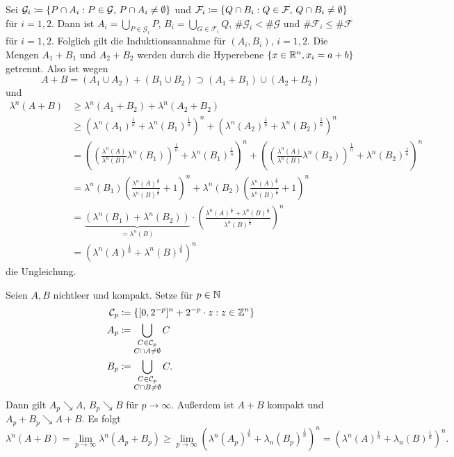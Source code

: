 \documentclass[a4paper,twoside,DIV15,BCOR12mm]{scrbook}
\begin{document}
\begin{beweis}
Sei $\mathcal G_i \da \{P \cap A_i: P\in\mathcal G,\, P\cap A_i\ne \emptyset\}$ und $\mathcal F_i \da \{Q \cap B_i: Q\in\mathcal F,\, Q\cap B_i\ne \emptyset\}$ für $i=1,2$. Dann ist $A_i = \bigcup_{P\in \mathcal G_i}P$, $B_i = \bigcup_{G\in \mathcal F_i}Q$, $\#\mathcal G_i < \#\mathcal G$ und $\#\mathcal F_i \le \#\mathcal F$ für $i=1,2$. Folglich gilt die Induktionsannahme für $(A_i,B_i)$, $i=1,2$. Die Mengen $A_1 + B_1$ und $A_2+B_2$ werden durch die Hyperebene $\{x\in\mathbb{R}^n, x_i = a+b\}$ getrennt. Also ist wegen
\[
A+B = (A_1\cup A_2) + (B_1\cup B_2) \supset (A_1 + B_1) \cup (A_2 + B_2)
\]
und
\begin{align*}
\lambda^n(A+B)
&\ge \lambda^n(A_1+B_2) + \lambda^n(A_2+B_2) \\
&\ge \left(\lambda^n(A_1)^{\frac 1n} + \lambda^n(B_1)^{\frac 1n}\right)^n + \left(\lambda^n(A_2)^{\frac 1n} + \lambda^n(B_2)^{\frac 1n}\right)^n \\
&= \left(\left(\frac{\lambda^n(A)}{\lambda^n(B)}\lambda^n(B_1)\right)^{\frac 1n} + \lambda^n(B_1)^{\frac 1n}\right)^n + \left(\left(\frac{\lambda^n(A)}{\lambda^n(B)}\lambda^n(B_2)\right)^{\frac 1n} + \lambda^n(B_2)^{\frac 1n}\right)^n\\
&= \lambda^n(B_1)\left( \frac{\lambda^n(A)^{\frac 1n}}{\lambda^n(B)^{\frac 1n}} + 1 \right)^n +\lambda^n(B_2)\left( \frac{\lambda^n(A)^{\frac 1n}}{\lambda^n(B)^{\frac 1n}} + 1 \right)^n\\
&= \underbrace{(\lambda^n(B_1) + \lambda^n(B_2))}_{=\lambda^n(B)} \cdot \left( \frac{\lambda^n(A)^{\frac 1n} + \lambda^n(B)^{\frac 1n}}{\lambda^n(B)^{\frac 1n}}\right)^n \\
&= \left( \lambda^n(A)^{\frac1n} + \lambda^n(B)^{\frac1n} \right)^n
\end{align*}
die Ungleichung.

Seien $A,B$ nichtleer und kompakt. Setze für $p\in\mathbb{N}$
\begin{align*}
\mathcal C_p &\da \{[0,2^{-p}]^n + 2^{-p}\cdot z : z\in\MdZ^n\} \\
A_p &\da \bigcup_{\substack{C\in\mathcal C_p \\ C\cap A \ne \emptyset}} C \\
B_p &\da \bigcup_{\substack{C\in\mathcal C_p \\ C\cap B \ne \emptyset}} C.
\end{align*}
Dann gilt $A_p \searrow A$, $B_p \searrow B$ für $p\to\infty$. Außerdem ist $A+B$ kompakt und $A_p + B_p \searrow A+ B$. Es folgt
\[
\lambda^n(A+B) = \lim_{p\to\infty} \lambda^n(A_p + B_p) 
\ge \lim_{p\to\infty} \left( \lambda^n(A_p)^{\frac 1n} + \lambda_n(B_p)^{\frac1n} \right)^n
=  \left( \lambda^n(A)^{\frac 1n} + \lambda_n(B)^{\frac1n} \right)^n.
\]
\end{beweis}
\end{document}
